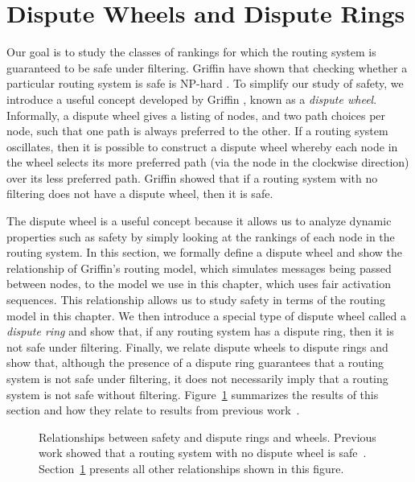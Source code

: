 \section{Dispute Wheels and Dispute Rings}
\label{sec:dw}

Our goal is to study the classes of rankings for which the routing
system is guaranteed to be safe under filtering.  Griffin \ea have shown
that checking whether a particular 
routing system is safe is NP-hard \cite{Griffin2002c}.  To simplify our study of safety, we
introduce a useful concept developed by Griffin \ea \cite{Griffin2002c},
known as a {\em dispute wheel}.  Informally, a dispute wheel gives a
listing of 
nodes, and two path choices per node, such that one path is always
preferred to the other.  
If a routing system oscillates, then it is possible to construct a
dispute wheel whereby each node in the wheel selects its more preferred
path (via the node in the clockwise direction) over its less preferred path.
Griffin \ea showed that if a
routing system with no filtering does not have a dispute wheel, then it
is safe. 

The dispute wheel is a useful concept because it allows us to analyze
dynamic properties such as safety by simply looking at the
rankings of each node in the routing system.  In this section, we formally
define a dispute wheel and show the relationship of Griffin's routing
model, which simulates messages being passed between nodes, to the model
we use in this chapter, which uses fair activation sequences.  This
relationship 
allows us to study safety in
terms of the routing model in this chapter.  We then introduce a special
type of dispute wheel 
called a {\em dispute ring} and show that, if any routing system has
a dispute ring, then it is not safe under filtering.  Finally, we relate
dispute wheels to dispute rings and show that, although the presence of
a dispute ring guarantees that a routing system is not safe under
filtering, it does not necessarily imply that a routing system is not safe
without filtering.  Figure~\ref{fig:stability_venn} summarizes the results of
this section and how they relate to results from previous
work~\cite{Griffin2002c}. 


\begin{figure}[t]
\centering
{}
\caption[Relationships between safety and dispute rings and
  wheels.]{Relationships between safety and dispute rings and wheels. 
  Previous work showed that a routing system with no dispute wheel is
  safe~\protect\cite{Griffin2002c}.  Section~\ref{sec:dw} presents all other
  relationships shown in this figure.}
\label{fig:stability_venn}
\end{figure}



